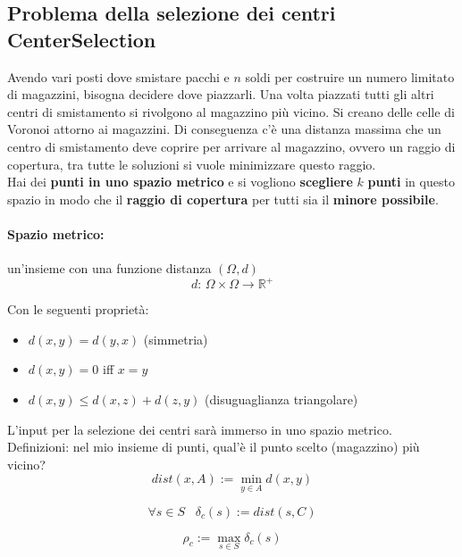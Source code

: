 \newpage

\subsection{Problema della selezione dei centri CenterSelection}
Avendo vari posti dove smistare pacchi e $n$ soldi per costruire un numero limitato di magazzini, bisogna decidere dove piazzarli. Una volta piazzati tutti gli altri centri di smistamento si rivolgono al magazzino più vicino. Si creano delle celle di Voronoi attorno ai magazzini. Di conseguenza c'è una distanza massima che un centro di smistamento deve coprire per arrivare al magazzino, ovvero un raggio di copertura, tra tutte le soluzioni si vuole minimizzare questo raggio.\\

Hai dei \textbf{punti in uno spazio metrico} e si vogliono \textbf{scegliere} $k$ \textbf{punti} in questo spazio in modo che il \textbf{raggio di copertura} per tutti sia il \textbf{minore possibile}.\\

\paragraph{Spazio metrico:} un'insieme con una funzione distanza $(\Omega, d)$ 
$$d: \, \Omega  \times \Omega \rightarrow \mathbb{R}^+$$

Con le seguenti proprietà:
\begin{itemize}
	\item $d(x,y) = d(y,x)$ (simmetria)
	\item $d(x,y) = 0$ iff $x=y$
	\item $d(x,y) \leq d(x,z) + d(z,y)$ (disuguaglianza triangolare)
\end{itemize}
L'input per la selezione dei centri sarà immerso in uno spazio metrico.\\

Definizioni: nel mio insieme di punti, qual'è il punto scelto (magazzino) più vicino?
$$ dist(x,A) := \min_{y \in A} d(x,y) $$

$$ \forall s \in S \;\;\; \delta_c (s) := dist(s,C)$$

$$ \rho_c := \max_{s \in S} \delta_c (s) $$

\newpage

